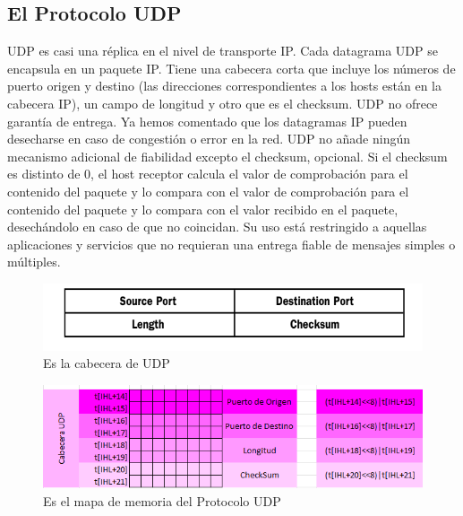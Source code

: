 	\subsection{El Protocolo UDP}
	UDP es casi una r\'eplica en el nivel de transporte IP. Cada datagrama UDP se encapsula en un paquete IP. Tiene una cabecera corta que incluye los n\'umeros de puerto origen y destino (las direcciones correspondientes a los hosts est\'an en la cabecera IP), un campo de longitud y otro que es el checksum. UDP no ofrece garant\'ia de entrega. Ya hemos comentado que los datagramas IP pueden desecharse en caso de congesti\'on o error en la red. UDP no a\~nade ning\'un mecanismo adicional de fiabilidad excepto el checksum, opcional. Si el checksum es distinto de 0, el host receptor calcula el valor de comprobaci\'on para el contenido del paquete y lo compara con el valor de comprobaci\'on para el contenido del paquete y lo compara con el valor recibido en el paquete, desech\'andolo en caso de que no coincidan. Su uso est\'a restringido a aquellas aplicaciones y servicios que no requieran una entrega fiable de mensajes simples o m\'ultiples.
	\begin{figure}[h]
			\centering		
			\includegraphics[width=\textwidth]{CabeceraUDP}
			\caption{Es la cabecera de UDP}
	\end{figure}
	\begin{figure}[h]
			\centering		
			\includegraphics[width=\textwidth]{MapaMemoriaUDP}
			\caption{Es el mapa de memoria del Protocolo UDP}
	\end{figure}
